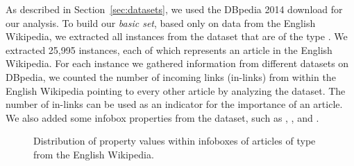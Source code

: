 \documentclass[a4paper,12pt]{scrartcl}
\begin{document}
As described in Section~\ref{sec:datasets}, we used the DBpedia 2014
download for our analysis. To build our \emph{basic set}, based only
on data from the English Wikipedia, we extracted all instances from
the  dataset that are of the type
.
%
We extracted 25,995 instances, each of which represents an article in
the English Wikipedia.
%
For each instance we gathered information from different datasets on
DBpedia, \eg
we counted the number of incoming links (in-links) from within
the English Wikipedia pointing to every other article by analyzing
the  dataset. The number of in-links can be
used as an indicator for the importance of an article. We also
added some infobox properties from the
 dataset, such as
, , and .
%
\newcommand{\plwidth}{.3\linewidth}%
\begin{figure*}
  \centering
  \begin{subfigure}{\plwidth}
  \end{subfigure}\hfill
  \begin{subfigure}{\plwidth}
  \end{subfigure}\hfill
  \begin{subfigure}{\plwidth}
  \end{subfigure}
  \caption{Distribution of property values within infoboxes of
    articles of type  from the English
    Wikipedia.}\label{fig:properties}
\end{figure*}
\end{document}
